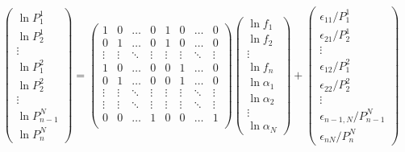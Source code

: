 \documentclass[12pt]{article}
\begin{document}
\begin{eqnarray*}
\left(\begin{array}{c}
	\ln P_1^1\\ \ln P_2^1\\ \vdots\\ \ln P_1^2\\ \ln P_2^2\\ \vdots \\ \ln P_{n-1}^N\\ \ln P_n^N
\end{array}\right)
=
\left(\begin{array}{cccc|cccc}
	1 & 0 & \ldots & 0 & 1 & 0 & \ldots & 0 \\
	0 & 1 & \ldots & 0 & 1 & 0 & \ldots & 0 \\
	\vdots& \vdots& \ddots& \vdots& \vdots& \vdots& \ddots& \vdots\\
\hline
	1 & 0 & \ldots & 0 & 0 & 1 & \ldots & 0 \\
	0 & 1 & \ldots & 0 & 0 & 1 & \ldots & 0 \\
	\vdots& \vdots& \ddots& \vdots& \vdots& \vdots& \ddots& \vdots\\
\hline
	\vdots& \vdots& \ddots& \vdots& \vdots& \vdots& \ddots& \vdots\\
	0 & 0 & \ldots & 1 & 0 & 0 & \ldots & 1 \\
\end{array}\right)
\left(\begin{array}{c}
	\ln f_1 \\ \ln f_2 \\ \vdots \\ \ln f_n \\
	\hline
	\ln\alpha_1 \\ \ln\alpha_2 \\ \vdots \\ \ln\alpha_N
\end{array}\right)
+ 
\left(\begin{array}{c}
	\epsilon_{11}/P_1^1\\
	\epsilon_{21}/P_2^1\\
	\vdots\\
	\epsilon_{12}/P_1^2\\
	\epsilon_{22}/P_2^2\\
	\vdots\\
	\epsilon_{n-1,N}/P_{n-1}^N\\
	\epsilon_{nN}/P_n^N
\end{array}\right)
\end{eqnarray*}
\end{document}
